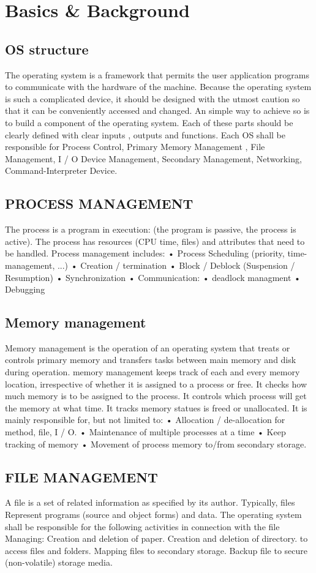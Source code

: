 \documentclass[preprint,12pt]{elsarticle}
\begin{document}
\section{\large{Basics \& Background}}
\subsection{OS structure}  
The operating system is a framework that permits the user application programs to communicate with the hardware of the machine. Because the operating system is such a complicated device, it should be designed with the utmost caution so that it can be conveniently accessed and changed. An simple way to achieve so is to build a component of the operating system. Each of these parts should be clearly defined with clear inputs , outputs and functions. Each OS shall be responsible for Process Control, Primary Memory Management , File Management, I / O Device Management, Secondary Management, Networking, Command-Interpreter Device.\cite{4}
\subsection{PROCESS MANAGEMENT}
The process is a program in execution: (the program is passive, the process is active). 
The process has resources (CPU time, files) and attributes that need to be handled. 
Process management includes: 
• Process Scheduling (priority, time-management, ...) 
• Creation / termination 
• Block / Deblock (Suspension / Resumption) 
• Synchronization 
• Communication: 
• deadlock managment 
• Debugging\cite{5}
\subsection{Memory management}
Memory management is the operation of an operating system that treats or controls primary memory and transfers tasks between main memory and disk during operation. memory management keeps track of each and every memory location, irrespective of whether it is assigned to a process or free. It checks how much memory is to be assigned to the process. It controls which process will get the memory at what time. It tracks memory statues is freed or unallocated. It is mainly responsible for, but not limited to: 
• Allocation / de-allocation for method, file, I / O. 
• Maintenance of multiple processes at a time
• Keep tracking of memory
• Movement of process memory to/from secondary storage.\cite{5}

\subsection{FILE MANAGEMENT}
A file is a set of related information as specified by its author. Typically, files 
Represent programs (source and object forms) and data. 
The operating system shall be responsible for the following activities in connection with the file 
Managing: 
Creation and deletion of paper. 
Creation and deletion of directory. 
to access files and folders. 
Mapping files to secondary storage. 
Backup file to secure (non-volatile) storage media.\cite{6}
\end{document}
